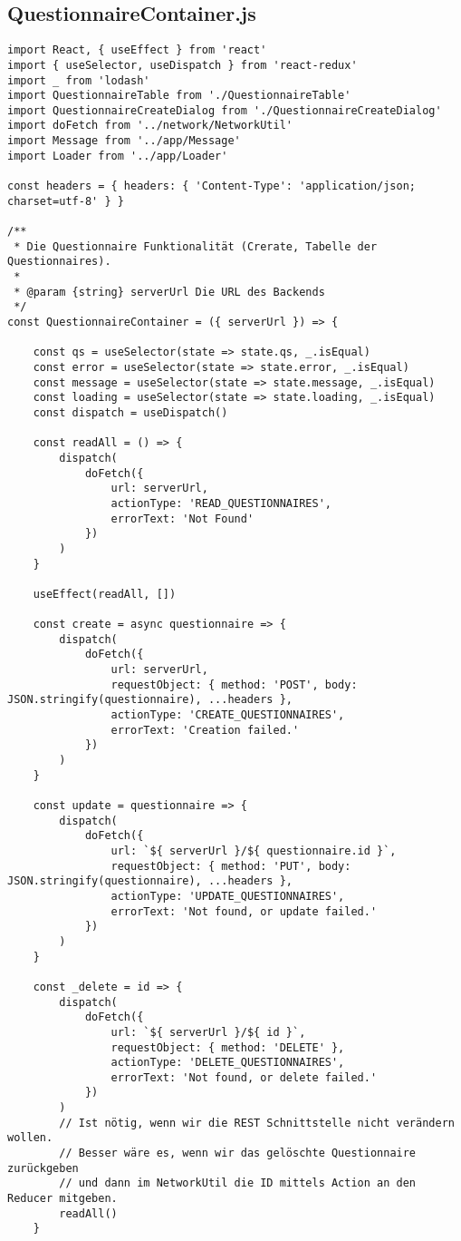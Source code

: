 \subsection{QuestionnaireContainer.js}
\begin{verbatim}
import React, { useEffect } from 'react'
import { useSelector, useDispatch } from 'react-redux'
import _ from 'lodash'
import QuestionnaireTable from './QuestionnaireTable'
import QuestionnaireCreateDialog from './QuestionnaireCreateDialog'
import doFetch from '../network/NetworkUtil'
import Message from '../app/Message'
import Loader from '../app/Loader'

const headers = { headers: { 'Content-Type': 'application/json; charset=utf-8' } }

/**
 * Die Questionnaire Funktionalität (Crerate, Tabelle der Questionnaires).
 * 
 * @param {string} serverUrl Die URL des Backends
 */
const QuestionnaireContainer = ({ serverUrl }) => {

    const qs = useSelector(state => state.qs, _.isEqual)
    const error = useSelector(state => state.error, _.isEqual)
    const message = useSelector(state => state.message, _.isEqual)
    const loading = useSelector(state => state.loading, _.isEqual)
    const dispatch = useDispatch()

    const readAll = () => {
        dispatch(
            doFetch({
                url: serverUrl,
                actionType: 'READ_QUESTIONNAIRES',
                errorText: 'Not Found'
            })
        )
    }

    useEffect(readAll, [])

    const create = async questionnaire => {
        dispatch(
            doFetch({
                url: serverUrl,
                requestObject: { method: 'POST', body: JSON.stringify(questionnaire), ...headers },
                actionType: 'CREATE_QUESTIONNAIRES',
                errorText: 'Creation failed.'
            })
        )
    }

    const update = questionnaire => {
        dispatch(
            doFetch({
                url: `${ serverUrl }/${ questionnaire.id }`,
                requestObject: { method: 'PUT', body: JSON.stringify(questionnaire), ...headers },
                actionType: 'UPDATE_QUESTIONNAIRES',
                errorText: 'Not found, or update failed.'
            })
        )
    }

    const _delete = id => {
        dispatch(
            doFetch({
                url: `${ serverUrl }/${ id }`,
                requestObject: { method: 'DELETE' },
                actionType: 'DELETE_QUESTIONNAIRES',
                errorText: 'Not found, or delete failed.'
            })
        )
        // Ist nötig, wenn wir die REST Schnittstelle nicht verändern wollen.
        // Besser wäre es, wenn wir das gelöschte Questionnaire zurückgeben
        // und dann im NetworkUtil die ID mittels Action an den Reducer mitgeben.
        readAll()
    }


\end{verbatim}

